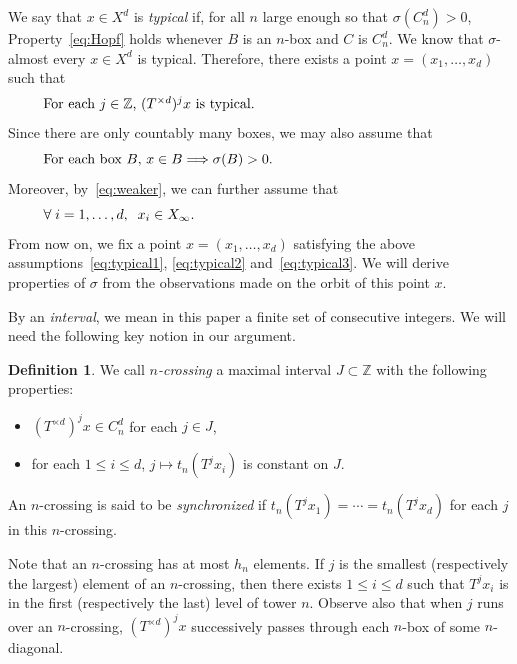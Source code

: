 \documentclass[10pt]{amsart}
\theoremstyle{definition}\newtheorem{defi}[theo]{Definition}\newtheorem{rema}[theo]{Remark}\newtheorem{exam}[theo]{Example}\newtheorem{exem}[theo]{Example}\newtheorem{nota}[theo]{Notation}
\newcommand{\ZZ}{\mathbb{Z}}
\newcommand{\cd}{C^{d}}
\newcommand{\td}{T^{\times d}}
\let\oldforall\forall
\renewcommand*{\forall}{\mathrel{\oldforall}}
\begin{document}
We say that $x\in X^d$ is \emph{typical} if, for all $n$ large enough so that $\sigma(\cd_n)>0$, Property~\eqref{eq:Hopf} holds whenever $B$ is an $n$-box and $C$ is $\cd_n$. We know that $\sigma$-almost every $x\in X^d$ is typical. Therefore, there exists a point $x=(x_1,\ldots,x_d)$ such that
\begin{equation}\label{eq:typical1}
\begin{minipage}[t]{0.9\textwidth}
For each $j\in\ZZ$, $(\td)^jx$ is typical.
\end{minipage}
\end{equation}
Since there are only countably many boxes, we may also assume that
\begin{equation}\label{eq:typical2}
\begin{minipage}[t]{0.9\textwidth}
For each box $B$, $x\in B\Longrightarrow\sigma(B)>0$.
\end{minipage}
\end{equation}
Moreover, by~\eqref{eq:weaker}, we can further assume that
\begin{equation}\label{eq:typical3}
\begin{minipage}[t]{0.9\textwidth}
$\forall i=1,\ldots,d,\;\; x_i\in X_\infty.$
\end{minipage}
\end{equation}
From now on, we fix a point $x=(x_1,\ldots,x_d)$ satisfying the above assumptions~\eqref{eq:typical1}, \eqref{eq:typical2} and~\eqref{eq:typical3}. We will derive properties of $\sigma$ from the observations made on the orbit of this point $x$.

By an \emph{interval}, we mean in this paper a finite set of consecutive integers. We will need the following key notion in our argument.
\begin{defi}\label{def:ncrossing}
We call \emph{$n$-crossing} a maximal interval $J\subset \ZZ$ with the following properties:
\begin{itemize}
\item $(\td)^j x\in \cd_n$ for each $j\in J$,
\item for each $1\le i\le d$, $j\mapsto t_n(T^jx_i)$ is constant on $J$.
\end{itemize}
An $n$-crossing is said to be \emph{synchronized} if $t_n(T^jx_1)=\cdots=t_n(T^jx_d)$ for each $j$ in this $n$-crossing.
\end{defi}

Note that an $n$-crossing has at most $h_n$ elements. If $j$ is the smallest (respectively the largest) element of an $n$-crossing, then there exists $1\le i\le d$ such that $T^{j}x_i$ is in the first (respectively the last) level of tower $n$. Observe also that when $j$ runs over an $n$-crossing, $(\td)^j x$ successively passes through each $n$-box of some $n$-diagonal.
\end{document}

